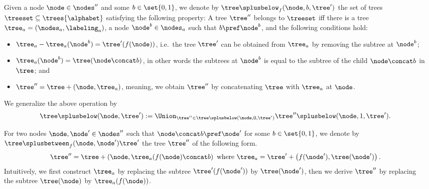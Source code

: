 Given a node $\node\in\nodes''$ and some $b\in\set{0,1}$, we denote by $\tree\splusbelow_f(\node,b,\tree')$ 
the set of trees $\treeset\subseteq\trees{\alphabet}$ satisfying the following property:
%
A tree $\tree''$ belongs to $\treeset$ iff there is a tree $\tree_a=(\nodes_a,\labeling_a)$, a node 
$\node^b\in\nodes_a$ such that $b\pref\node^b$, and the following conditions hold:
%
\begin{itemize}
\item $\tree_a-\tree_a(\node^b)=\tree'(f(\node))$, i.e.\ the tree $\tree'$ 
can be obtained from $\tree_a$ by removing the subtree at $\node^b$;
%
\item $\tree_a(\node^b)=\tree(\node\concat b)$, in other words the subtrees at $\node^b$ is 
equal to the subtree of the child $\node\concat b$ in $\tree$; and
%
\item $\tree''=\tree+(\node,\tree_a)$, meaning, we obtain $\tree''$ by concatenating $\tree$ 
with $\tree_a$ at $\node$.
\end{itemize}
%
We generalize the above operation by 
%
\[
\tree\splusbelow(\node,\tree'):=\Union_{\tree''\in
\tree\splusbelow(\node,0,\tree')}\tree''\splusbelow(\node,1,\tree')\text{.}
\]
%

For two nodes $\node,\node'\in\nodes''$ such that $\node\concat b\pref\node'$ for some 
$b\in\set{0,1}$, we denote by $\tree\splusbetween_f(\node,\node')\tree'$ the tree $\tree''$ 
of the following form.
%
\[
\tree''=\tree+\left(\node,\tree_a(f(\node)\concat b\right)\text{ where }
\tree_a=\tree'+\left(f(\node'),\tree(\node')\right)\text{.}
\]
%
Intuitively, we first construct $\tree_a$ by replacing the subtree $\tree'(f(\node'))$ by 
$\tree(\node')$, then we derive $\tree''$ by replacing the subtree $\tree(\node)$ by 
$\tree_a(f(\node))$.
%

